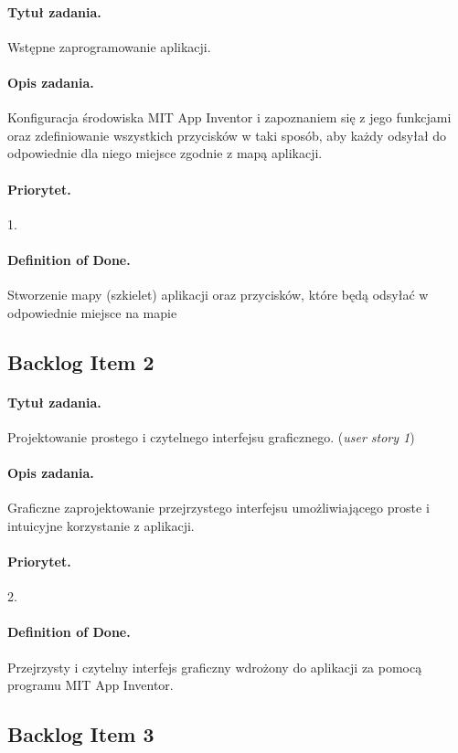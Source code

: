 \documentclass[a4paper]{article}
\begin{document}
	\paragraph{Tytuł zadania.} Wstępne zaprogramowanie aplikacji.
	\paragraph{Opis zadania.} Konfiguracja środowiska MIT App Inventor i zapoznaniem się z jego funkcjami oraz zdefiniowanie wszystkich przycisków w taki sposób, aby każdy odsyłał do odpowiednie dla niego miejsce zgodnie z mapą aplikacji.
	\paragraph{Priorytet.} 1.
	\paragraph{Definition of Done.} Stworzenie mapy (szkielet) aplikacji oraz przycisków, które będą odsyłać w odpowiednie miejsce na mapie
	
	\subsection{Backlog Item 2}
	\paragraph{Tytuł zadania.} Projektowanie prostego i czytelnego interfejsu graficznego. (\textit{user story 1})
	\paragraph{Opis zadania.} Graficzne zaprojektowanie przejrzystego interfejsu umożliwiającego proste i intuicyjne korzystanie z aplikacji.
	\paragraph{Priorytet.} 2.
	\paragraph{Definition of Done.} Przejrzysty i czytelny interfejs graficzny wdrożony do aplikacji za pomocą programu MIT App Inventor.
	
	\subsection{Backlog Item 3}
\end{document}

